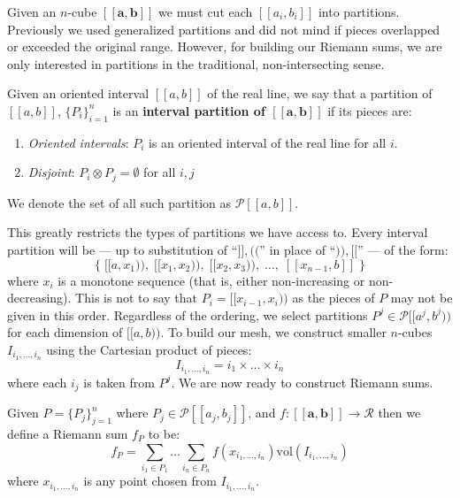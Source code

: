 Given an $n$-cube $[\![\boldsymbol{a}, \boldsymbol{b}]\!]$ we must cut each $[\![a_i, b_i]\!]$ into partitions.
Previously we used generalized partitions and did not mind if pieces overlapped or exceeded the original range.
However, for building our Riemann sums, we are only interested in partitions in the traditional, non-intersecting sense.

\begin{definition}
	Given an oriented interval $[\![a,b]\!]$ of the real line, we say that a partition of $[\![a,b]\!]$, $\{P_i\}_{i=1}^n$
	is an \textbf{interval partition of $\boldsymbol{[\![a,b]\!]}$} if its pieces are:
	\begin{enumerate}
		\item \emph{Oriented intervals}: $P_i$ is an oriented interval of the real line for all $i$.
		\item \emph{Disjoint}: $P_i \otimes P_j = \emptyset$ for all $i,j$
	\end{enumerate}
	We denote the set of all such partition as $\mathcal{P}[\![a,b]\!]$.
\end{definition}

This greatly restricts the types of partitions we have access to.
Every interval partition will be --- up to substitution of ``$]\!], (\!($'' in place of ``$)\!), [\![$'' --- of the form:
\begin{equation}
	\Big\{ \; [\![a,x_1)\!), \; [\![x_1, x_2)\!), \; [\![x_2, x_3)\!),\; \ldots,\; [\![x_{n-1}, b]\!] \; \Big\}
\end{equation}
where $x_i$ is a monotone sequence (that is, either non-increasing or non-decreasing).
This is not to say that $P_i = [\![x_{i-1}, x_i )\!)$ as the pieces of $P$ may not be given in this order.
Regardless of the ordering, we select partitions $P^j \in \mathcal{P}[\![a^j,b^j)\!)$ for each dimension of $[\![a,b)\!)$.
To build our mesh, we construct smaller $n$-cubes $I_{i_1, \ldots, i_n}$ using the Cartesian product of pieces:
\begin{equation}
	I_{i_1, \ldots, i_n} = i_1 \times \ldots \times i_n
\end{equation}
where each $i_j$ is taken from $P^j$.
We are now ready to construct Riemann sums.

\begin{definition}
	Given $P=\{ P_j \}_{j=1}^n$ where $P_j \in \mathcal{P}[\![a_j, b_j]\!]$,
	and $f:[\![\boldsymbol{a}, \boldsymbol{b}]\!] \to \mathcal{R}$ then we define a Riemann sum $f_P$ to be:
	\begin{equation}
		f_P = \sum_{i_1 \in P_1} \ldots \sum_{i_n \in P_n} f(x_{i_1, \ldots, i_n}) \text{vol}(I_{i_1, \ldots, i_n})
	\end{equation}
	where $x_{i_1, \ldots, i_n}$ is any point chosen from $I_{i_1, \ldots, i_n}$.
\end{definition}

